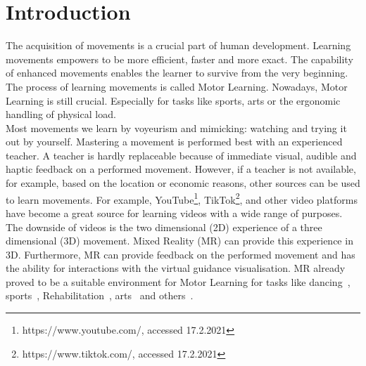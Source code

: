 \chapter{Introduction}
The acquisition of movements is a crucial part of human development. Learning movements empowers to be more efficient, faster and more exact. The capability of enhanced movements enables the learner to survive from the very beginning. The process of learning movements is called Motor Learning. Nowadays, Motor Learning is still crucial. Especially for tasks like sports, arts or the ergonomic handling of physical load.\\
Most movements we learn by voyeurism and mimicking: watching and trying it out by yourself. Mastering a movement is performed best with an experienced teacher. A teacher is hardly replaceable because of immediate visual, audible and haptic feedback on a performed movement. However, if a teacher is not available, for example, based on the location or economic reasons, other sources can be used to learn movements. For example, YouTube\footnote{https://www.youtube.com/, accessed 17.2.2021}, TikTok\footnote{https://www.tiktok.com/, accessed 17.2.2021}, and other video platforms have become a great source for learning videos with a wide range of purposes. The downside of videos is the two dimensional (2D) experience of a three dimensional (3D) movement. Mixed Reality (MR) can provide this experience in 3D. Furthermore, MR can provide feedback on the performed movement and has the ability for interactions with the virtual guidance visualisation. MR already proved to be a suitable environment for Motor Learning for tasks like dancing~\cite{YouMove,vrdancetrainer,outsideme,performancetraining,mrdancetrainer}, sports~\cite{freethrowsimulator,trainingphysicalskills}, Rehabilitation~\cite{motionma,physioathome,kinohaptics,sleevear,veimprovesml}, arts~\cite{ararm,justfollowme,stylo,elearningma,mythaichicoaches,rtgesturerecognistion,onebody,thaichichua} and others~\cite{tikl,lightguide}.\\
